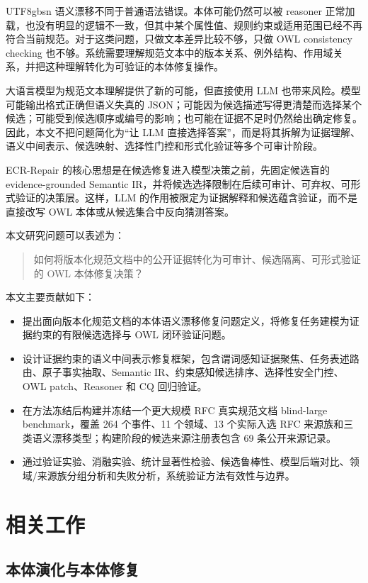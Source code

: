 \documentclass[11pt]{article}
\begin{document}
\begin{CJK*}{UTF8}{gbsn}
语义漂移不同于普通语法错误。本体可能仍然可以被 reasoner 正常加载，也没有明显的逻辑不一致，但其中某个属性值、规则约束或适用范围已经不再符合当前规范。对于这类问题，只做文本差异比较不够，只做 OWL consistency checking 也不够。系统需要理解规范文本中的版本关系、例外结构、作用域关系，并把这种理解转化为可验证的本体修复操作。

大语言模型为规范文本理解提供了新的可能，但直接使用 LLM 也带来风险。模型可能输出格式正确但语义失真的 JSON；可能因为候选描述写得更清楚而选择某个候选；可能受到候选顺序或编号的影响；也可能在证据不足时仍然给出确定修复。因此，本文不把问题简化为“让 LLM 直接选择答案”，而是将其拆解为证据理解、语义中间表示、候选映射、选择性门控和形式化验证等多个可审计阶段。

ECR-Repair 的核心思想是在候选修复进入模型决策之前，先固定候选盲的 evidence-grounded Semantic IR，并将候选选择限制在后续可审计、可弃权、可形式验证的决策层。这样，LLM 的作用被限定为证据解释和候选蕴含验证，而不是直接改写 OWL 本体或从候选集合中反向猜测答案。

本文研究问题可以表述为：

\begin{quote}
如何将版本化规范文档中的公开证据转化为可审计、候选隔离、可形式验证的 OWL 本体修复决策？
\end{quote}

本文主要贡献如下：

\begin{itemize}
    \item 提出面向版本化规范文档的本体语义漂移修复问题定义，将修复任务建模为证据约束的有限候选选择与 OWL 闭环验证问题。
    \item 设计证据约束的语义中间表示修复框架，包含谓词感知证据聚焦、任务表述路由、原子事实抽取、Semantic IR、约束感知候选排序、选择性安全门控、OWL patch、Reasoner 和 CQ 回归验证。
    \item 在方法冻结后构建并冻结一个更大规模 RFC 真实规范文档 blind-large benchmark，覆盖 264 个事件、11 个领域、13 个实际入选 RFC 来源族和三类语义漂移类型；构建阶段的候选来源注册表包含 69 条公开来源记录。
    \item 通过验证实验、消融实验、统计显著性检验、候选鲁棒性、模型后端对比、领域/来源族分组分析和失败分析，系统验证方法有效性与边界。
\end{itemize}

\section{相关工作}

\subsection{本体演化与本体修复}


\end{CJK*}
\end{document}
